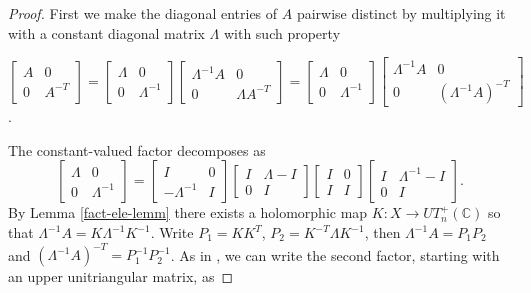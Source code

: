 \documentclass[10pt]{amsart}
\theoremstyle{remark}
\begin{document}
\begin{proof}%
First we make the diagonal entries of $A$ pairwise distinct by multiplying it with a constant diagonal matrix $\Lambda$ with such property
\begin{center}
    $\left[\begin{array}{ccc} A & 0 \\ 0 & A^{-T}\end{array}\right] = \left[\begin{array}{ccc} \Lambda & 0 \\ 0 & \Lambda^{-1}\end{array}\right]
    \left[\begin{array}{ccc} \Lambda^{-1}A & 0 \\ 0 & \Lambda A^{-T}\end{array}\right] 
    =  
    \left[\begin{array}{ccc} \Lambda & 0 \\ 0 & \Lambda^{-1}\end{array}\right]
    \left[\begin{array}{ccc} \Lambda^{-1}A & 0 \\ 0 & (\Lambda^{-1} A)^{-T}\end{array}\right]$.
\end{center}
The constant-valued factor decomposes as
\[
    \begin{bmatrix} \Lambda & 0 \\ 0 & \Lambda^{-1}   \end{bmatrix}
    = 
    \begin{bmatrix} I & 0 \\ -\Lambda^{-1}  & I  \end{bmatrix}
    \begin{bmatrix} I & \Lambda - I \\ 0 & I  \end{bmatrix}
    \begin{bmatrix} I & 0 \\ I & I  \end{bmatrix}
    \begin{bmatrix} I &  \Lambda^{-1} - I \\ 0 & I  \end{bmatrix}.
\]
By Lemma \ref{fact-ele-lemm} there exists a holomorphic map $K : X \to UT^+_n(\mathbb{C})$ so that $\Lambda^{-1}A = K\Lambda^{-1} K^{-1}$. 
Write $P_1 = KK^T$, $P_2 =  K^{-T} \Lambda K^{-1}$, then $\Lambda^{-1}A = P_1 P_2$ and $(\Lambda^{-1} A)^{-T} = P_1^{-1} P_2^{-1}$. 
As in \cite[Lemma 1]{JLX2}, we can write the second factor, starting with an upper unitriangular matrix, as

\end{proof}
\end{document}

